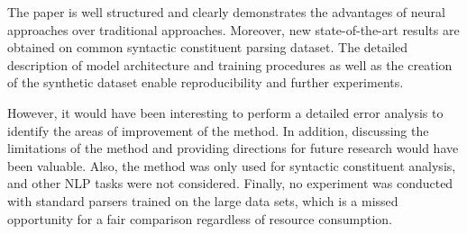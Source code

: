 \documentclass[12pt]{article}
\begin{document}
The paper is well structured and clearly demonstrates the advantages of neural approaches over traditional approaches. Moreover, new state-of-the-art results are obtained on common syntactic constituent parsing dataset. The detailed description of model architecture and training procedures as well as the creation of the synthetic dataset enable reproducibility and further experiments.

However, it would have been interesting to perform a detailed error analysis to identify the areas of improvement of the method. In addition, discussing the limitations of the method and providing directions for future research would have been valuable. Also, the method was only used for syntactic constituent analysis, and other NLP tasks were not considered. Finally, no experiment was conducted with standard parsers trained on the large data sets, which is a missed opportunity for a fair comparison regardless of resource consumption.
\end{document}
